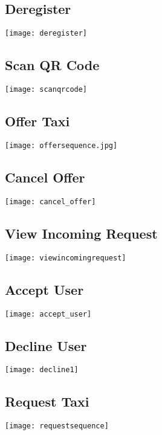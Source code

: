 \documentclass[english]{article}
\begin{document}
\subsection{Deregister}
\texttt{[image: deregister]}

\subsection{Scan QR Code}
\texttt{[image: scanqrcode]}

\subsection{Offer Taxi}
\texttt{[image: offersequence.jpg]}

\subsection{Cancel Offer}
\texttt{[image: cancel\_offer]}

\subsection{View Incoming Request}
\texttt{[image: viewincomingrequest]}

\subsection{Accept User}
\texttt{[image: accept\_user]}

\subsection{Decline User}
\texttt{[image: decline1]}

\subsection{Request Taxi}
\texttt{[image: requestsequence]}
\end{document}
